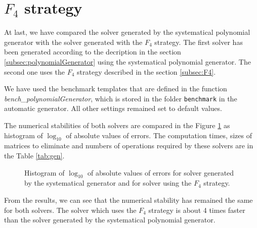 \section{$F_4$ strategy}
\label{exp:gen}
At last, we have compared the solver generated by the systematical polynomial generator with the solver generated with the $F_4$ strategy. The first solver has been generated according to the decription in the section \ref{subsec:polynomialGenerator} using the systematical polynomial generator. The second one uses the $F_4$ strategy described in the section \ref{subsec:F4}.

We have used the benchmark templates that are defined in the function \textit{bench\_poly\-nomialGenerator}, which is stored in the folder \texttt{benchmark} in the automatic generator. All other settings remained set to default values.

The numerical stabilities of both solvers are compared in the Figure \ref{graph:gen} as histogram of $\log_{10}$ of absolute values of errors. The computation times, sizes of matrices to eliminate and numbers of operations required by these solvers are in the Table \ref{tab:gen}.

\begin{figure}[ht]
  \centering
  \resizebox{0.95\textwidth}{!}{}
  \caption{Histogram of $\log_{10}$ of absolute values of errors for solver generated by the systematical generator and for solver using the $F_4$ strategy.}
  \label{graph:gen}
\end{figure}

From the results, we can see that the numerical stability has remained the same for both solvers. The solver which uses the $F_4$ strategy is about 4 times faster than the solver generated by the systematical polynomial generator.

